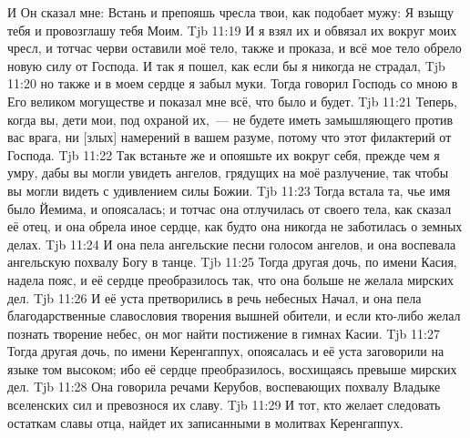 И Он сказал мне: Встань и препояшь чресла твои, как подобает мужу: Я взыщу тебя и провозглашу тебя Моим.
\vs Tjb 11:19
И я взял их и обвязал их вокруг моих чресл, и тотчас черви оставили моё тело, также и проказа, и всё мое тело обрело новую силу от Господа. И так я пошел, как если бы я никогда не страдал,
\vs Tjb 11:20
но также и в моем сердце я забыл муки. Тогда говорил Господь со мною в Его великом могуществе и показал мне всё, что было и будет.
\vs Tjb 11:21
Теперь, когда вы, дети мои, под охраной их,~--- не будете иметь замышляющего против вас врага, ни [злых] намерений в вашем разуме, потому что этот филактерий от Господа.
\vs Tjb 11:22
Так встаньте же и опояшьте их вокруг себя, прежде чем я умру, дабы вы могли увидеть ангелов, грядущих на моё разлучение, так чтобы вы могли видеть с удивлением силы Божии.
\vs Tjb 11:23
Тогда встала та, чье имя было Йемима, и опоясалась; и тотчас она отлучилась от своего тела, как сказал её отец, и она обрела иное сердце, как будто она никогда не заботилась о земных делах.
\vs Tjb 11:24
И она пела ангельские песни голосом ангелов, и она воспевала ангельскую похвалу Богу в танце.
\vs Tjb 11:25
Тогда другая дочь, по имени Касия, надела пояс, и её сердце преобразилось так, что она больше не желала мирских дел.
\vs Tjb 11:26
И её уста претворились в речь небесных Начал, и она пела благодарственные славословия творения вышней обители, и если кто-либо желал познать творение небес, он мог найти постижение в гимнах Касии.
\vs Tjb 11:27
Тогда другая дочь, по имени Керенгаппух, опоясалась и её уста заговорили на языке том высоком; ибо её сердце преобразилось, восхищаясь превыше мирских дел.
\vs Tjb 11:28
Она говорила речами Керубов, воспевающих похвалу Владыке вселенских сил и превознося их славу.
\vs Tjb 11:29
И тот, кто желает следовать остаткам славы отца, найдет их записанными в молитвах Керенгаппух.


